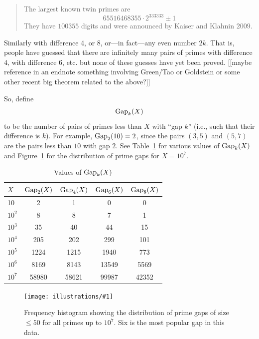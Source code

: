 \documentclass[11pt]{article}
\newcommand{\ill}[3]{ 
   \begin{figure}[H]
   \begin{center}
   \texttt{[image: illustrations/\#1]}
   \caption{#3}
   \end{center}
    \end{figure}
}
\theoremstyle{plain}
\theoremstyle{definition}
\numberwithin{equation}{section}
\numberwithin{figure}{section}
\numberwithin{table}{section}
\begin{document}
\begin{quote} The largest known twin primes are 
$$65516468355\cdot 2^{333333} \pm 1$$
They have $100355$ digits and were announced by Kaiser and Klahnin
$2009$.
\end{quote}


Similarly with difference $4$, or $8$, or---in fact---any even number
$2k$. That is, people have guessed that there are infinitely many
pairs of primes with difference $4$, with difference $6$, etc. but
none of these guesses have yet been proved. [[maybe reference in an
endnote something involving Green/Tao or Goldstein or some other
recent big theorem related to the above?]]




   
So, define $${\rm Gap}_{k}(X)$$ to be the number of pairs of primes
less than $X$ with ``gap $k$'' (i.e., such that their difference is
$k$).  For example, ${\rm Gap}_2(10) = 2$, since the pairs $(3,5)$ and
$(5,7)$ are the pairs less than $10$ with gap $2$.
See Table~\ref{tab:gap} for various values of ${\rm Gap}_{k}(X)$
and Figure~\ref{fig:primegapdist} for the distribution of prime gaps
for $X=10^7$.
   
   \bigskip
   
\begin{table}[H]
\begin{center}
\caption{Values of ${\rm Gap}_{k}(X)$ \label{tab:gap}}
\vspace{1em}

\begin{tabular}{|l|c|c|c|c|}\hline
$X$ & ${\rm Gap}_{2}(X)$ & ${\rm Gap}_{4}(X)$& ${\rm Gap}_{6}(X)$ & ${\rm Gap}_{8}(X)$\\\hline
10 & 2 & 1 & 0 & 0\\\hline
$10^2$ & 8 & 8 & 7 & 1 \\\hline
$10^3$ & 35 & 40 & 44 & 15 \\\hline
$10^4$ & 205 & 202 & 299 & 101 \\\hline
$10^5$ & 1224 & 1215 & 1940 & 773 \\\hline
$10^6$ & 8169 & 8143 & 13549 & 5569 \\\hline
$10^7$ & 58980 & 58621 & 99987 & 42352 \\\hline
\end{tabular}
\end{center}
\end{table}  



\ill{primegapdist}{1}{Frequency histogram showing the distribution of prime gaps of size $\leq 50$ for all primes up to $10^7$.  Six is the most popular gap in this data.\label{fig:primegapdist}}
\end{document}
